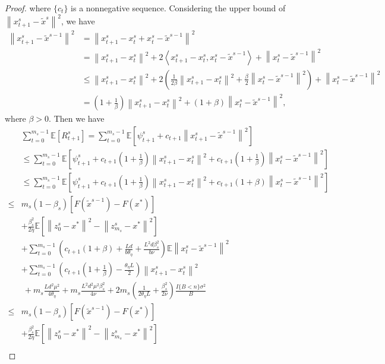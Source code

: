 \documentclass{article}
\newcommand*{\E}{\mathbb{E}}
\newcommand{\norm}[1]{\left\lVert#1\right\rVert}
\newcommand{\Iprod}[2]{\left\langle #1,#2\right\rangle}
\theoremstyle{definition}
\theoremstyle{remark}
\begin{document}
{\begin{proof}
where $\{c_t\}$ is a nonnegative sequence. Considering the upper bound of $\norm{x_{t+1}^s-\widetilde{x}^s}^2$, we have
\begin{equation}
\begin{split}
\norm{x_{t+1}^s-\widetilde{x}^{s-1}}^2 &= \norm{x_{t+1}^s-x_t^s+x_t^s-\widetilde{x}^{s-1}}^2\\
&=\norm{x_{t+1}^s-x_t^s}^2+2\Iprod{x_{t+1}^s-x_t^s}{x_t^s-\widetilde{x}^{s-1}}+\norm{x_t^s-\widetilde{x}^{s-1}}^2\\
&\leq \norm{x_{t+1}^s-x_{t}^s}^2 + 2(\frac{1}{2\beta}\norm{x_{t+1}^s-x_{t}^s}^2+\frac{\beta}{2}\norm{x_t^s-\widetilde{x}^{s-1}}^2)+\norm{x_t^s-\widetilde{x}^{s-1}}^2\\
&= (1+\frac{1}{\beta})\norm{x_{t+1}^s-x_{t}^s}^2+(1+\beta)\norm{x_t^s-\widetilde{x}^{s-1}}^2,
\end{split}
\end{equation}
where $\beta > 0$. Then we have 
\begin{equation}
\begin{split}
&\sum_{t=0}^{m_s-1} \E[R_{t+1}^s] = \sum_{t=0}^{m_s-1}\E\left[\psi_{t+1}^s+ c_{t+1}\norm{x_{t+1}^s-\tilde{x}^{s-1}}^2\right]\\
&\leq \sum_{t=0}^{m_s-1}\E\left[\psi_{t+1}^s+ c_{t+1}(1+\frac{1}{\beta})\norm{x_{t+1}^s-x_{t}^s}^2+ c_{t+1}(1+\frac{1}{\beta})\norm{x_{t}^s-\tilde{x}^{s-1}}^2\right]\\
&\leq \sum_{t=0}^{m_s-1}\E\left[\psi_{t+1}^s+ c_{t+1}(1+\frac{1}{\beta})\norm{x_{t+1}^s-x_{t}^s}^2+ c_{t+1}(1+{\beta})\norm{x_{t}^s-\tilde{x}^{s-1}}^2\right]\\
\leq & m_s(1-\beta_s)[F(\widetilde{x}^{s-1})-F(x^*)] \\
&+ {\frac{ \beta_s^2}{2\eta}}\E[\norm{z_{0}^s-x^*}^2-\norm{z_{m_s}^s-x^*}^2]\\
&+ \sum_{t=0}^{m_s-1} (c_{t+1}(1+{\beta})+\frac{Ld}{b\theta_{\eta}}+\frac{L^2d\beta_s^2}{b\nu})\E\norm{x_t^s-\widetilde{x}^{s-1}}^2\\
&+\sum_{t=0}^{m_s-1}(c_{t+1}(1+\frac{1}{\beta})-\frac{\theta_{\eta} L}{2})\norm{x_{t+1}^s-x_{t}^s}^2\\
&~+m_s\frac{Ld^2\mu^2}{4\theta_{\eta}}+m_s\frac{ L^2d^2\mu^2\beta_s^2}{4\nu}+2m_s(\frac{1}{2\theta_{\eta} L}+\frac{\beta_s^2}{2\nu})\frac{I\{B < n\} \sigma ^2}{B}\\
\leq & m_s(1-\beta_s)[F(\widetilde{x}^{s-1})-F(x^*)] \\
&+ {\frac{ \beta_s^2}{2\eta}}\E[\norm{z_{0}^s-x^*}^2-\norm{z_{m_s}^s-x^*}^2]\\

\end{split}
\end{equation}
\end{proof}}
\end{document}
